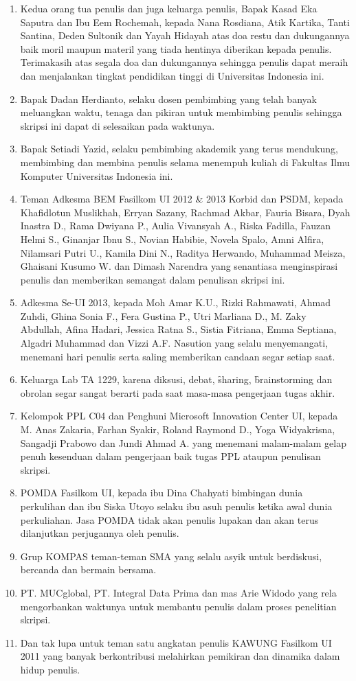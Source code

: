 \begin{enumerate}
	\item Kedua orang tua penulis dan juga keluarga penulis, Bapak Kasad Eka Saputra dan Ibu Eem Rochemah, kepada Nana Rosdiana, Atik Kartika, Tanti Santina, Deden Sultonik dan Yayah Hidayah atas doa restu dan dukungannya baik moril maupun materil yang tiada hentinya diberikan kepada penulis. Terimakasih atas segala doa dan dukungannya sehingga penulis dapat meraih dan menjalankan tingkat pendidikan tinggi di Universitas Indonesia ini.
	\item Bapak Dadan Herdianto, selaku dosen pembimbing yang telah banyak meluangkan waktu, tenaga dan pikiran untuk membimbing penulis sehingga skripsi ini dapat di selesaikan pada waktunya.
	\item Bapak Setiadi Yazid, selaku pembimbing akademik yang terus mendukung, membimbing dan membina penulis selama menempuh kuliah di Fakultas Ilmu Komputer Universitas Indonesia ini.
	\item Teman Adkesma BEM Fasilkom UI 2012 \& 2013 Korbid dan PSDM, kepada Khafidlotun Muslikhah, Erryan Sazany, Rachmad Akbar, Fauria Bisara, Dyah Inastra D., Rama Dwiyana P., Aulia Vivansyah A., Riska Fadilla, Fauzan Helmi S., Ginanjar Ibnu S., Novian Habibie, Novela Spalo, Amni Alfira, Nilamsari Putri U., Kamila Dini N., Raditya Herwando, Muhammad Meisza, Ghaisani Kusumo W. dan Dimash Narendra yang senantiasa menginspirasi penulis dan memberikan semangat dalam penulisan skripsi ini.
	\item Adkesma Se-UI 2013, kepada Moh Amar K.U., Rizki Rahmawati, Ahmad Zuhdi, Ghina Sonia F., Fera Gustina P., Utri Marliana D., M. Zaky Abdullah, Afina Hadari, Jessica Ratna S., Sistia Fitriana, Emma Septiana, Algadri Muhammad dan Vizzi A.F. Nasution  yang selalu menyemangati, menemani hari penulis serta saling memberikan candaan segar setiap saat.
	\item Keluarga Lab TA 1229, karena diksusi, debat, \f{sharing}, \f{brainstorming} dan obrolan segar sangat berarti pada saat masa-masa pengerjaan tugas akhir.
	\item Kelompok PPL C04 dan Penghuni Microsoft Innovation Center UI, kepada M. Anas Zakaria, Farhan Syakir, Roland Raymond D., Yoga Widyakrisna, Sangadji Prabowo dan Jundi Ahmad A. yang menemani malam-malam gelap penuh kesenduan dalam pengerjaan baik tugas PPL ataupun penulisan skripsi.
	\item POMDA Fasilkom UI, kepada ibu Dina Chahyati bimbingan dunia perkulihan dan ibu Siska Utoyo selaku ibu asuh penulis ketika awal dunia perkuliahan. Jasa POMDA tidak akan penulis lupakan dan akan terus dilanjutkan perjugannya oleh penulis.
	\item Grup KOMPAS teman-teman SMA yang selalu asyik untuk berdiskusi, bercanda dan bermain bersama.
	\item PT. MUCglobal, PT. Integral Data Prima dan mas Arie Widodo yang rela mengorbankan waktunya untuk membantu penulis dalam proses penelitian skripsi.
	\item Dan tak lupa untuk teman satu angkatan penulis KAWUNG Fasilkom UI 2011 yang banyak berkontribusi melahirkan pemikiran dan dinamika dalam hidup penulis.
\end{enumerate}

